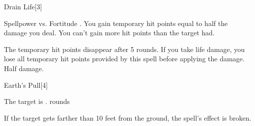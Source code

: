 \begin{spellsection}{Drain Life}[3]
    \begin{spellheader}
    \end{spellheader}
    \begin{spellcontent}
        \begin{spelltargetinginfo}
        \end{spelltargetinginfo}
        \begin{spelleffects}
            \begin{spellattack}{Spellpower vs. Fortitude}
                \spellsuccess {}. You gain temporary hit points equal to half the damage you deal. You can't gain more hit points than the target had.

                The temporary hit points disappear after 5 rounds. If you take life damage, you lose all temporary hit points provided by this spell before applying the damage.
                \spellfailure Half damage.
            \end{spellattack}
        \end{spelleffects}
    \end{spellcontent}
    \begin{spellfooter}
        \miscastrandom
    \end{spellfooter}
\end{spellsection}


\begin{spellsection}{Earth's Pull}[4]
    \begin{spellheader}
    \end{spellheader}
    \begin{spellcontent}
        \begin{spelltargetinginfo}
            \spellrng{\rngclose}
        \end{spelltargetinginfo}
        \begin{spelleffects}
            \spelleffect The target is \slowed.
             rounds
        \end{spelleffects}
    \end{spellcontent}
    \begin{spellfooter}
        \spellnotes If the target gets farther than 10 feet from the ground, the spell's effect is broken.
        \miscastrandom
    \end{spellfooter}
\end{spellsection}

